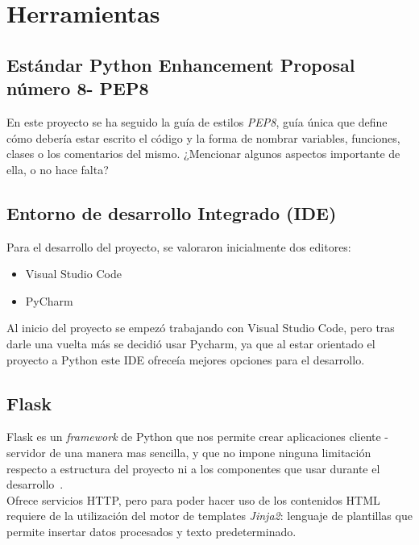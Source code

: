 \section{Herramientas}

\subsection{Estándar Python Enhancement Proposal número 8- PEP8}
En este proyecto se ha seguido la guía de estilos \textit{PEP8}, guía única que define cómo debería estar escrito el código y la forma de nombrar variables, funciones, clases o los comentarios del mismo.
¿Mencionar algunos aspectos importante de ella, o no hace falta?

\subsection{Entorno de desarrollo Integrado (IDE)}
Para el desarrollo del proyecto, se valoraron inicialmente dos editores:
\begin{itemize}
	\item Visual Studio Code
	\item PyCharm
\end{itemize}
Al inicio del proyecto se empezó trabajando con Visual Studio Code, pero tras darle una vuelta más se decidió usar Pycharm, ya que al estar orientado el proyecto a Python este IDE ofreceía mejores opciones para el desarrollo.

\subsection{Flask}
Flask es un \textit{framework} de Python que nos permite crear aplicaciones cliente - servidor de una manera mas sencilla, y que no impone ninguna limitación respecto a estructura del proyecto ni a los componentes que usar durante el desarrollo~\cite{grinberg2014flask}.
\\
Ofrece servicios HTTP, pero para poder hacer uso de los contenidos HTML requiere de la utilización del motor de templates \textit{Jinja2}: lenguaje de plantillas que permite insertar datos procesados y texto predeterminado.



